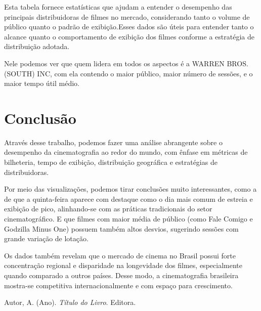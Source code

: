 \documentclass{article}
\begin{document}
Esta tabela fornece estatísticas que ajudam a entender o desempenho das principais distribuidoras 
de filmes no mercado, considerando tanto o volume de público quanto o padrão de exibição.Esses dados
são úteis para entender tanto o alcance quanto o comportamento de exibição dos filmes conforme a estratégia de distribuição adotada.

Nele podemos ver que quem lidera em todos os aspectos é a WARREN BROS. (SOUTH) INC, com ela
contendo o maior público, maior número de sessões, e o maior tempo útil médio.

\section*{Conclusão}

Através desse trabalho, podemos fazer uma análise abrangente sobre o desempenho da cinematografia ao redor do mundo,
com ênfase em métricas de bilheteria, tempo de exibição, distribuição geográfica e estratégias de distribuidoras.

Por meio das visualizações, podemos tirar conclusões muito interessantes, como a de que a quinta-feira aparece com 
destaque como o dia mais comum de estreia e exibição de pico, alinhando-se com as práticas tradicionais do setor cinematográfico. E que
filmes com maior média de público (como Fale Comigo e Godzilla Minus One) possuem também altos desvios, sugerindo sessões com grande variação de lotação.

Os dados também revelam que o mercado de cinema no Brasil possui forte concentração regional e disparidade na longevidade dos filmes,
especialmente quando comparado a outros países. Desse modo, a cinematografia brasileira mostra-se competitiva internacionalmente e com espaço para crescimento.

\begin{thebibliography}{99}

Autor, A. (Ano). \textit{Título do Livro}. Editora.

\end{thebibliography}
\end{document}
